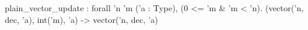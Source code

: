 plain_vector_update : forall 'n 'm ('a : Type), (0 <= 'm & 'm < 'n).
  (vector('n, dec, 'a), int('m), 'a) -> vector('n, dec, 'a)